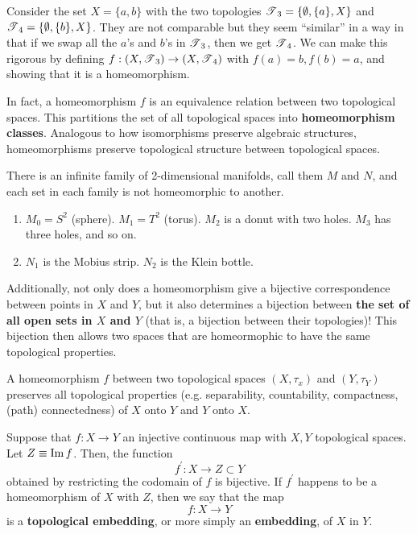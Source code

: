   \begin{example}
    Consider the set $X = \{a, b\}$ with the two topologies $\T_3 = \{\emptyset, \{a\}, X\}$ and $\T_4 = \{\emptyset, \{b\}, X\}$. They are not comparable but they seem ``similar'' in a way in that if we swap all the $a$'s and $b$'s in $\T_3$, then we get $\T_4$. We can make this rigorous by defining $f: (X, \T_3) \rightarrow (X, \T_4)$ with $f(a) = b, f(b) = a$, and showing that it is a homeomorphism. 
  \end{example}

  In fact, a homeomorphism $f$ is an equivalence relation between two topological spaces. This partitions the set of all topological spaces into \textbf{homeomorphism classes}. Analogous to how isomorphisms preserve algebraic structures, homeomorphisms preserve topological structure between topological spaces. 

  \begin{example}
    There is an infinite family of 2-dimensional manifolds, call them $M$ and $N$, and each set in each family is not homeomorphic to another.  
    \begin{enumerate}
      \item $M_0 = S^2$ (sphere). $M_1 = T^2$ (torus). $M_2$ is a donut with two holes. $M_3$ has three holes, and so on. 
      \item $N_1$ is the Mobius strip. $N_2$ is the Klein bottle. 
    \end{enumerate}
  \end{example}

  Additionally, not only does a homeomorphism give a bijective correspondence between points in $X$ and $Y$, but it also determines a bijection between \textbf{the set of all open sets in $X$ and $Y$} (that is, a bijection between their topologies)! This bijection then allows two spaces that are homeormophic to have the same topological properties. 

  \begin{theorem}
    A homeomorphism $f$ between two topological spaces $(X, \tau_{x})$ and $(Y, \tau_{Y})$ preserves all topological properties (e.g. separability, countability, compactness, (path) connectedness) of $X$ onto $Y$ and $Y$ onto $X$. 
  \end{theorem}

  \begin{definition}[Embedding]
    Suppose that $f: X \longrightarrow Y$ an injective continuous map with $X, Y$ topological spaces. Let $Z \equiv \im{f}$. Then, the function
    \begin{equation}
      f^\prime: X \longrightarrow Z \subset Y
    \end{equation}
    obtained by restricting the codomain of $f$ is bijective. If $f^\prime$ happens to be a homeomorphism of $X$ with $Z$, then we say that the map
    \begin{equation}
      f: X \longrightarrow Y
    \end{equation}
    is a \textbf{topological embedding}, or more simply an \textbf{embedding}, of $X$ in $Y$. 
  \end{definition}

